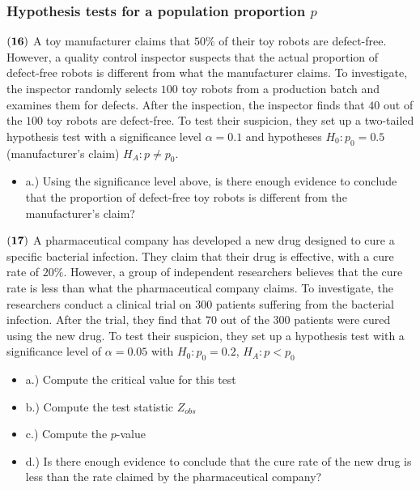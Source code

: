 \documentclass[
]{article}
\providecommand{\tightlist}{%
  \setlength{\itemsep}{0pt}\setlength{\parskip}{0pt}}
\begin{document}
\subsubsection{\texorpdfstring{Hypothesis tests for a population
proportion
\(p\)}{Hypothesis tests for a population proportion p}}\label{hypothesis-tests-for-a-population-proportion-p}

\(\bf (16)\) A toy manufacturer claims that \(50\%\) of their toy robots
are defect-free. However, a quality control inspector suspects that the
actual proportion of defect-free robots is different from what the
manufacturer claims. To investigate, the inspector randomly selects
\(100\) toy robots from a production batch and examines them for
defects. After the inspection, the inspector finds that \(40\) out of
the \(100\) toy robots are defect-free. To test their suspicion, they
set up a two-tailed hypothesis test with a significance level
\(\alpha = 0.1\) and hypotheses \(H_0: p_0 = 0.5\) (manufacturer's
claim) \(H_A: p \neq p_0\).

\begin{itemize}
\tightlist
\item
  a.) Using the significance level above, is there enough evidence to
  conclude that the proportion of defect-free toy robots is different
  from the manufacturer's claim?
\end{itemize}

\(\bf (17)\) A pharmaceutical company has developed a new drug designed
to cure a specific bacterial infection. They claim that their drug is
effective, with a cure rate of \(20\%\). However, a group of independent
researchers believes that the cure rate is less than what the
pharmaceutical company claims. To investigate, the researchers conduct a
clinical trial on \(300\) patients suffering from the bacterial
infection. After the trial, they find that \(70\) out of the \(300\)
patients were cured using the new drug. To test their suspicion, they
set up a hypothesis test with a significance level of \(\alpha = 0.05\)
with \(H_0: p_0 = 0.2\), \(H_A: p < p_0\)

\begin{itemize}
\item
  a.) Compute the critical value for this test
\item
  b.) Compute the test statistic \(Z_{obs}\)
\item
  c.) Compute the \(p\)-value
\item
  d.) Is there enough evidence to conclude that the cure rate of the new
  drug is less than the rate claimed by the pharmaceutical company?
\end{itemize}
\end{document}
